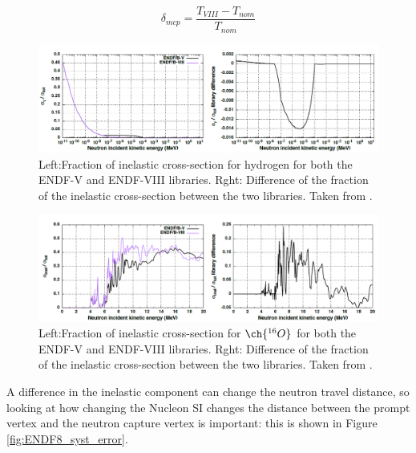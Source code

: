 \begin{equation}
    \delta_{m c p}=\frac{T_{V I I I}-T_{n o m}}{T_{n o m}}
\label{eq:MICAP_uncertainty}
\end{equation}

\begin{figure}[!htb]
    \centering
    \includegraphics[width=\textwidth]{Figures/neutron_cross_section_endf_H.PNG}
\caption{Left:Fraction of inelastic cross-section for hydrogen for both the ENDF-V and ENDF-VIII libraries. Rght: Difference of the fraction of the inelastic cross-section between the two libraries. Taken from \cite{tn415_fiacob}.}
\label{fig:neutron_cross_section_H}
\end{figure}

\begin{figure}[!htb]
    \centering
    \includegraphics[width=\textwidth]{Figures/neutron_cross_section_endf_O.PNG}
\caption{Left:Fraction of inelastic cross-section for $\ch{^{16}O}$ for both the ENDF-V and ENDF-VIII libraries. Rght: Difference of the fraction of the inelastic cross-section between the two libraries. Taken from \cite{tn415_fiacob}.}
\label{fig:neutron_cross_section_O}
\end{figure}

A difference in the inelastic component can change the neutron travel distance, so looking at how changing the Nucleon SI changes the distance between the prompt vertex and the neutron capture vertex is important: this is shown in Figure \ref{fig:ENDF8_syst_error}.

